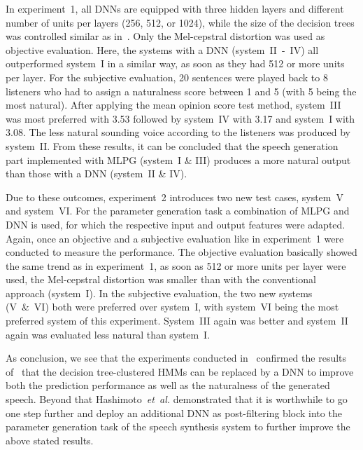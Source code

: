 In experiment~1, all \acp{DNN} are equipped with three hidden layers and different number of units per layers (256, 512, or 1024), while the size of the decision trees was controlled similar as in~\cite{zen:deepstatistical}. Only the Mel-cepstral distortion was used as objective evaluation. Here, the systems with a \ac{DNN} (system~II~-~IV) all outperformed system~I in a similar way, as soon as they had 512 or more units per layer. For the subjective evaluation, 20 sentences were played back to 8 listeners who had to assign a naturalness score between 1 and 5 (with 5 being the most natural). After applying the mean opinion score test method, system~III was most preferred with 3.53 followed by system~IV with 3.17 and system~I with 3.08. The less natural sounding voice according to the listeners was produced by system~II. From these results, it can be concluded that the speech generation part implemented with \ac{MLPG} (system~I \& III) produces a more natural output than those with a \ac{DNN} (system~II \& IV).

Due to these outcomes, experiment~2 introduces two new test cases, system~V and system~VI. For the parameter generation task a combination of \ac{MLPG} and \ac{DNN} is used, for which the respective input and output features were adapted. Again, once an objective and a subjective evaluation like in experiment~1 were conducted to measure the performance. The objective evaluation basically showed the same trend as in experiment~1, as soon as 512 or more units per layer were used, the Mel-cepstral distortion was smaller than with the conventional approach (system~I). In the subjective evaluation, the two new systems (V~\&~VI) both were preferred over system~I, with system~VI being the most preferred system of this experiment. System~III again was better and system~II again was evaluated less natural than system~I.

As conclusion, we see that the experiments conducted in~\cite{hashimoto:effect} confirmed the results of~\cite{zen:deepstatistical} that the decision tree-clustered \acp{HMM} can be replaced by a \ac{DNN} to improve both the prediction performance as well as the naturalness of the generated speech. Beyond that Hashimoto~\textit{et~al.} demonstrated that it is worthwhile to go one step further and deploy an additional \ac{DNN} as post-filtering block into the parameter generation task of the speech synthesis system to further improve the above stated results.


